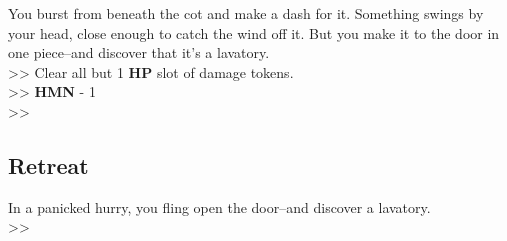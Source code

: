 You burst from beneath the cot and make a dash for it. Something swings by your head, close enough to catch the wind off it. But you make it to the door in one piece--and discover that it’s a lavatory.\\

>> Clear all but 1 \textbf{HP} slot of damage tokens.\\
>> \textbf{HMN} - 1\\
>> 

\subsection*{Retreat}
In a panicked hurry, you fling open the door--and discover a lavatory.\\

>> 